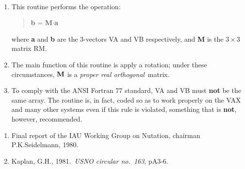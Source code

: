 {
}
{
  \\
}
{
}
\notes
{
 \begin{enumerate}
  \item This routine performs the operation:
        \begin{verse}
         {\bf b} = {\bf M}$\cdot${\bf a}
        \end{verse}
        where {\bf a} and {\bf b} are the 3-vectors VA and VB
        respectively, and {\bf M} is the $3\times3$ matrix RM.
  \item The main function of this routine is apply a
        rotation;  under these circumstances, ${\bf M}$ is a
        {\it proper real orthogonal}\, matrix.
  \item To comply with the ANSI Fortran 77 standard, VA and VB must
        {\bf not} be the same array.  The routine is, in fact, coded
        so as to work properly on the VAX and many other systems even
        if this rule is violated, something that is {\bf not}, however,
        recommended.
 \end{enumerate}
}
{
}
{
}
{
}
{
 \begin{enumerate}
  \item Final report of the IAU Working Group on Nutation,
        chairman P.K.Seidelmann, 1980.
  \item Kaplan, G.H., 1981.\ {\it USNO circular no.\ 163}, pA3-6.
 \end{enumerate}
}
